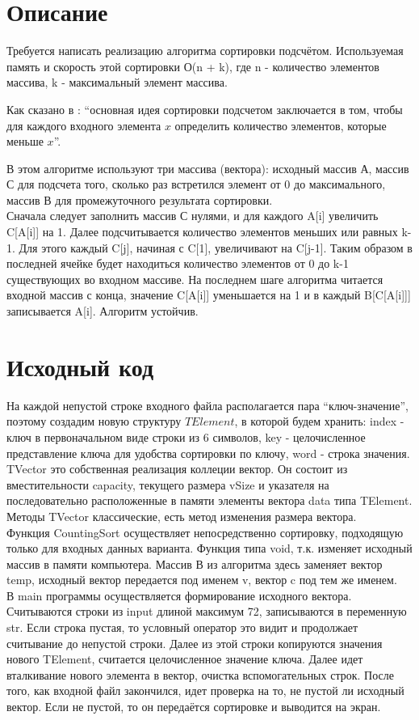 \documentclass[pdf, unicode, 12pt, a4paper,oneside,fleqn]{article}
\begin{document}
\section{Описание}
Требуется написать реализацию алгоритма сортировки подсчётом. Используемая память и скорость этой сортировки О(n + k), где n - количество элементов массива, k - максимальный элемент массива. 

Как сказано в \cite{Kormen}: \enquote{основная идея сортировки подсчетом заключается в том, чтобы для каждого входного 
элемента $x$ определить количество элементов, которые меньше $x$}.

В этом алгоритме используют три массива (вектора): исходный массив А, массив С для подсчета того, сколько раз встретился элемент от 0 до максимального, массив В для промежуточного результата сортировки.  \\
Сначала следует заполнить массив С нулями, и для каждого A[i] увеличить C[A[i]] на 1. Далее подсчитывается количество элементов меньших или равных k-1. Для этого каждый C[j], начиная с C[1], увеличивают на C[j-1]. Таким образом в последней ячейке будет находиться количество элементов от 0 до k-1 существующих во входном массиве. На последнем шаге алгоритма читается входной массив с конца, значение C[A[i]] уменьшается на 1 и в каждый B[C[A[i]]] записывается A[i]. Алгоритм устойчив.

\pagebreak

\section{Исходный код}
На каждой непустой строке входного файла располагается пара \enquote{ключ-значение}, поэтому создадим новую 
структуру $TElement$, в которой будем хранить: index - ключ в первоначальном виде строки из 6 символов, key - целочисленное представление ключа для удобства сортировки по ключу, word - строка значения. \\ TVector это собственная реализация коллеции вектор. Он состоит из вместительности capacity, текущего размера vSize и указателя на последовательно расположенные в памяти элементы вектора data типа TElement. Методы TVector классические, есть метод изменения размера вектора. \\
Функция CountingSort осуществляет непосредственно сортировку, подходящую только для входных данных варианта. Функция типа void, т.к. изменяет исходный массив в памяти компьютера. Массив В из алгоритма здесь заменяет вектор temp, исходный вектор передается под именем v, вектор c под тем же именем. \\
В main программы осуществляется формирование исходного вектора. Считываются строки из input длиной максимум 72, записываются в переменную str. Если строка пустая, то условный оператор это видит и продолжает считывание до непустой строки. Далее из этой строки копируются значения нового TElement, считается целочисленное значение ключа. Далее идет вталкивание нового элемента в вектор, очистка вспомогательных строк. После того, как входной файл закончился, идет проверка на то, не пустой ли исходный вектор. Если не пустой, то он передаётся сортировке и выводится на экран. 
\end{document}
